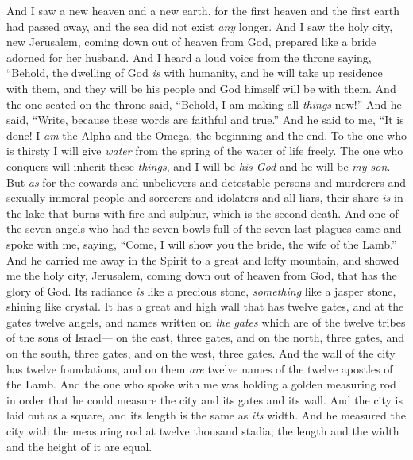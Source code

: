 \begin{biblechapter} %
 And I saw a new heaven and a new earth, for the first heaven and the first earth had passed away, and the sea did not exist \textit{any} longer.
\verse And I saw the holy city, new Jerusalem, coming down out of heaven from God, prepared like a bride adorned for her husband.
\verse And I heard a loud voice from the throne saying,
\verse “Behold, the dwelling of God \textit{is} with humanity, 
and he will take up residence with them, 
and they will be his people 
and God himself will be with them.
\verse And the one seated on the throne said, “Behold, I am making all \textit{things} new!” And he said, “Write, because these words are faithful and true.”
\verse And he said to me, “It is done! I \textit{am} the Alpha and the Omega, the beginning and the end. To the one who is thirsty I will give \textit{water} from the spring of the water of life freely.
\verse The one who conquers will inherit these \textit{things}, and I will be \textit{his God} and he will be \textit{my son}.
\verse But \textit{as} for the cowards and unbelievers and detestable persons and murderers and sexually immoral people and sorcerers and idolaters and all liars, their share \textit{is} in the lake that burns with fire and sulphur, which is the second death.
 And one of the seven angels who had the seven bowls full of the seven last plagues came and spoke with me, saying, “Come, I will show you the bride, the wife of the Lamb.”
\verse And he carried me away in the Spirit to a great and lofty mountain, and showed me the holy city, Jerusalem, coming down out of heaven from God,
\verse that has the glory of God. Its radiance \textit{is} like a precious stone, \textit{something} like a jasper stone, shining like crystal.
\verse It has a great and high wall that has twelve gates, and at the gates twelve angels, and names written on \textit{the gates} which are of the twelve tribes of the sons of Israel—
\verse on the east, three gates, and on the north, three gates, and on the south, three gates, and on the west, three gates.
\verse And the wall of the city has twelve foundations, and on them \textit{are} twelve names of the twelve apostles of the Lamb.
\verse And the one who spoke with me was holding a golden measuring rod in order that he could measure the city and its gates and its wall.
\verse And the city is laid out as a square, and its length is the same as \textit{its} width. And he measured the city with the measuring rod at twelve thousand stadia; the length and the width and the height of it are equal.

\end{biblechapter}
